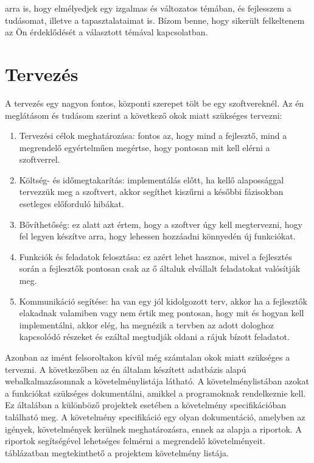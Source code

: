 \documentclass[]{thesis-ekf}
\theoremstyle{definition}
\theoremstyle{remark}
\begin{document}
arra is, hogy elmélyedjek egy izgalmas és változatos témában, és fejlesszem a tudásomat, illetve a tapasztalataimat is. Bízom benne, hogy sikerült felkeltenem az Ön érdeklődését a választott témával kapcsolatban. 
	
	\chapter{Tervezés}
		A tervezés egy nagyon fontos, központi szerepet tölt be egy szoftvereknél. Az én meglátásom és tudásom szerint a következő okok miatt szükséges tervezni:
		\begin{enumerate}
			\item Tervezési célok meghatározása: fontos az, hogy mind a fejlesztő, mind a megrendelő egyértelműen megértse, hogy pontosan mit kell elérni a szoftverrel.
			\item Költség- és időmegtakarítás: implementálás előtt, ha kellő alapossággal tervezzük meg a szoftvert, akkor segíthet kiszűrni a későbbi fázisokban esetleges előforduló hibákat. 
			\item Bővíthetőség: ez alatt azt értem, hogy a szoftver úgy kell megtervezni, hogy fel legyen készítve arra, hogy lehessen hozzáadni könnyedén új funkciókat.
			\item Funkciók és feladatok felosztása: ez azért lehet hasznos, mivel a fejlesztés során a fejlesztők pontosan csak az ő általuk elvállalt feladatokat valósítják meg.
			\item Kommunikáció segítése: ha van egy jól kidolgozott terv, akkor ha a fejlesztők elakadnak valamiben vagy nem értik meg pontosan, hogy mit és hogyan kell implementálni, akkor elég, ha megnézik a tervben az adott dologhoz kapcsolódó részeket és ezáltal megtudják oldani a rájuk bízott feladatot.
		\end{enumerate}
		Azonban az imént felsoroltakon kívül még számtalan okok miatt szükséges a tervezni. A következőben az én általam készített adatbázis alapú webalkalmazásomnak a követelménylistája látható. A követelménylistában azokat a funkciókat szükséges dokumentálni, amikkel a programoknak rendelkeznie kell. Ez általában a különböző projektek esetében a követelmény specifikációban található meg. A követelmény specifikáció egy olyan dokumentáció, amelyben az igények, követelmények kerülnek meghatározásra, ennek az alapja a riportok. A riportok segítségével lehetséges felmérni a megrendelő követelményeit.  táblázatban megtekinthető a projektem követelmény listája.
		
\end{document}
